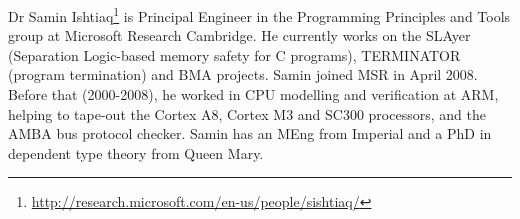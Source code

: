 \documentclass[a4paper,10pt]{article}
\begin{document}
Dr Samin Ishtiaq\footnote{\url{http://research.microsoft.com/en-us/people/sishtiaq/}}
is Principal Engineer in the Programming Principles and Tools group at
Microsoft Research Cambridge. He currently works on the SLAyer
(Separation Logic-based memory safety for C programs), TERMINATOR
(program termination) and BMA projects. Samin joined MSR in April
2008. Before that (2000-2008), he worked in CPU modelling and
verification at ARM, helping to tape-out the Cortex A8, Cortex M3 and
SC300 processors, and the AMBA bus protocol checker. Samin has an MEng
from Imperial and a PhD in dependent type theory from Queen Mary.



\end{document}
